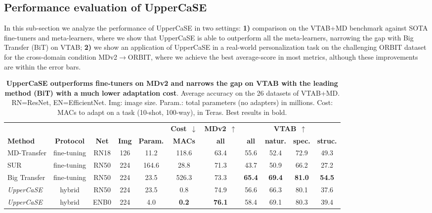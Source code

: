 \documentclass{article}
\begin{document}
\subsection{Performance evaluation of UpperCaSE} \label{ssec:analysis_uppercase}

In this sub-section we analyze the performance of UpperCaSE in two settings: \textbf{1)} comparison on the VTAB+MD benchmark against SOTA fine-tuners and meta-learners, where we show that UpperCaSE is able to outperform all the meta-learners, narrowing the gap with Big Transfer (BiT) on VTAB; \textbf{2)} we show an application of UpperCaSE in a real-world personalization task on the challenging ORBIT dataset \citep{massiceti2021orbit} for the cross-domain condition MDv2$\rightarrow$ORBIT, where we achieve the best average-score in most metrics, although these improvements are within the error bars.


\begin{table}[!h]
\caption{\textbf{UpperCaSE outperforms fine-tuners on MDv2 and narrows the gap on VTAB with the leading method (BiT) with a much lower adaptation cost}. Average accuracy on the 26 datasets of VTAB+MD. RN=ResNet, EN=EfficientNet. Img: image size. Param.: total parameters (no adapters) in millions. Cost: MACs to adapt on a task (10-shot, 100-way), in Teras. 
Best results in bold.}
\vskip 0.1in
\begin{adjustbox}{width=1.0\textwidth,center}
\begin{tabular}{lcccccccccc}
\toprule
 & & & & & \multicolumn{1}{c}{\textbf{Cost}~$\downarrow$} & \multicolumn{1}{c}{\textbf{MDv2}~$\uparrow$} & \multicolumn{4}{c}{\textbf{VTAB}~$\uparrow$} \\
 \cmidrule(lr){6-6} \cmidrule(lr){7-7} \cmidrule(lr){8-11}
 \textbf{Method} & \textbf{Protocol} & \textbf{Net} & \textbf{Img} & \textbf{Param.} & \textbf{MACs} & \textbf{all} & \textbf{all} & \textbf{natur.}  & \textbf{spec.} & \textbf{struc.} \\
\midrule
MD-Transfer & fine-tuning & RN18 & 126 & 11.2 & 118.6 & 63.4 & 55.6 & 52.4 & 72.9 & 49.3 \\ 
SUR & fine-tuning & RN50 & 224 & 164.6 & 28.8 & 71.3 & 43.7 & 50.9 & 66.2 & 27.2 \\
Big Transfer & fine-tuning & RN50 & 224 & 23.5 & 526.3 & 73.3 & \textbf{65.4} & \textbf{69.4} & \textbf{81.0} & \textbf{54.5} \\
\midrule
\emph{UpperCaSE} & hybrid & RN50 & 224 & 23.5 & 0.8 & 74.9 & 56.6 & 66.3 & 80.1 & 37.6 \\
\emph{UpperCaSE} & hybrid & ENB0 & 224 & 4.0 & \textbf{0.2} & \textbf{76.1} & 58.4 & 69.1 & 80.3 & 39.4 \\
\bottomrule
\end{tabular}
\end{adjustbox}
\label{tab:uppercase_vs_finetuners_vtab_md_results}
\end{table}
\end{document}
